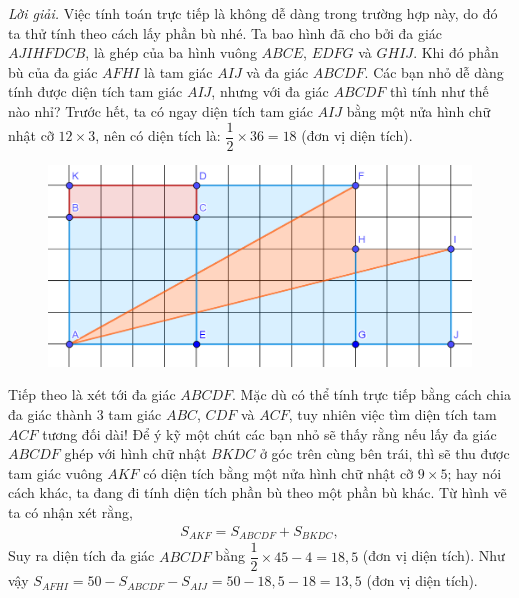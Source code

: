 \begin{multicols}{2}
\begin{figure}[H]
		\vspace*{-15pt}
	\end{figure}
	\textit{Lời giải.} Việc tính toán trực tiếp là không dễ dàng trong trường hợp này, do đó ta thử tính theo cách lấy phần bù nhé. Ta bao hình đã cho bởi đa giác $AJIHFDCB$, là ghép của ba hình vuông $ABCE$, $EDFG$ và $GHIJ$. Khi đó phần bù của đa giác $AFHI$ là tam giác $AIJ$ và đa giác $ABCDF$.
	\vskip 0.1cm
	Các bạn nhỏ dễ dàng tính được diện tích tam giác $AIJ$, nhưng với đa giác $ABCDF$ thì tính như thế nào nhỉ? 
	\vskip 0.1cm
	Trước hết, ta có ngay diện tích tam giác $AIJ$ bằng một nửa hình chữ nhật cỡ $12\times3$, nên có diện tích là: $\dfrac{1}{2}\times 36=18$ (đơn vị diện tích). 
	\begin{figure}[H]
		\centering
		\captionsetup{labelformat= empty, justification=centering}
		\includegraphics[width=1\linewidth]{18}
		\vspace*{-15pt}
	\end{figure}
	Tiếp theo là xét tới đa giác $ABCDF$. Mặc dù có thể tính trực tiếp bằng cách chia đa giác thành $3$ tam giác $ABC$, $CDF$ và $ACF$, tuy nhiên việc tìm diện tích tam $ACF$ tương đối dài! Để ý kỹ một chút các bạn nhỏ sẽ thấy rằng nếu lấy đa giác $ABCDF$ ghép với hình chữ nhật $BKDC$ ở góc trên cùng bên trái, thì sẽ thu được tam giác vuông $AKF$ có diện tích bằng một nửa hình chữ nhật cỡ $9\times5$; hay nói cách khác, ta đang đi tính diện tích phần bù theo một phần bù khác. 
	\vskip 0.1cm
	Từ hình vẽ ta có nhận xét rằng, 
	\begin{align*}
		S_{AKF}=S_{ABCDF}+S_{BKDC},
	\end{align*} 
	Suy ra diện tích đa giác $ABCDF$ bằng  $\dfrac{1}{2} \times45-4=18{,}5$ (đơn vị diện tích). 
	\vskip 0.1cm
	Như vậy $S_{AFHI}=50-S_{ABCDF}-S_{AIJ}=50-18{,}5-18=13{,}5$ (đơn vị diện tích). 

\end{multicols}
